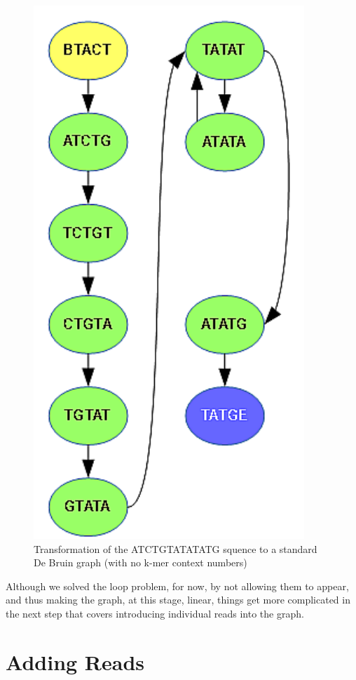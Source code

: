 \begin{figure}
	\centering
	\includegraphics{img/ref-db.pdf}
	\caption{Transformation of the ATCTGTATATATG squence to a standard De Bruin graph (with no k-mer context numbers)}
	\label{fig:ref-db}
\end{figure}

Although we solved the loop problem, for now, by not allowing them to appear, and thus making the graph, at this stage, linear, things get more complicated in the next step that covers introducing individual reads into the graph.

\section{Adding Reads}

